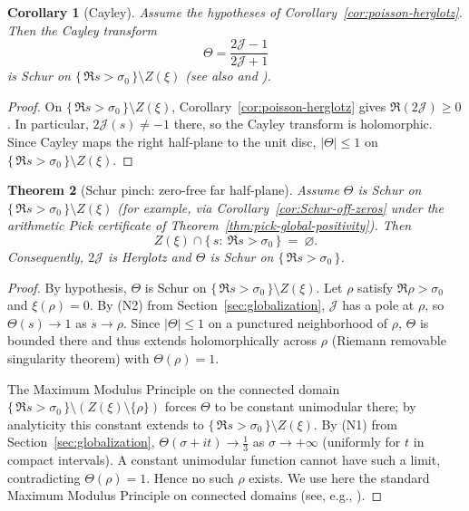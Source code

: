 \documentclass[11pt]{article}
\newtheorem{theorem}{Theorem}
\newtheorem{corollary}[theorem]{Corollary}
\theoremstyle{definition}
\theoremstyle{remark}
\theoremstyle{definition}
\begin{document}
\begin{corollary}[Cayley]\label{cor:cayley-schur}
Assume the hypotheses of Corollary~\ref{cor:poisson-herglotz}. Then the Cayley transform
\[
\Theta=\frac{2\mathcal J-1}{2\mathcal J+1}
\]
is Schur on $\{\,\Re s>\sigma_0\,\}\setminus Z(\xi)$ (see also \cite[Ch.~2]{RosenblumRovnyak} and \cite{SarasonSubHardy}).
\end{corollary}
\begin{proof}
On $\{\,\Re s>\sigma_0\,\}\setminus Z(\xi)$, Corollary~\ref{cor:poisson-herglotz} gives $\Re(2\mathcal J)\ge 0$. In particular, $2\mathcal J(s)\neq -1$ there, so the Cayley transform is holomorphic. Since Cayley maps the right half-plane to the unit disc, $|\Theta|\le 1$ on $\{\,\Re s>\sigma_0\,\}\setminus Z(\xi)$.
\end{proof}
\begin{theorem}[Schur pinch: zero-free far half-plane]\label{thm:globalize-main}
Assume \(\Theta\) is Schur on \(\{\,\Re s>\sigma_0\,\}\setminus Z(\xi)\) (for example, via Corollary~\ref{cor:Schur-off-zeros} under the arithmetic Pick certificate of Theorem~\ref{thm:pick-global-positivity}). Then
\[
  Z(\xi)\cap\{\,s:\ \Re s>\sigma_0\,\}\ =\ \varnothing.
\]
Consequently, $2\mathcal J$ is Herglotz and $\Theta$ is Schur on $\{\,\Re s>\sigma_0\,\}$.
\end{theorem}
\begin{proof}
By hypothesis, \(\Theta\) is Schur on \(\{\,\Re s>\sigma_0\,\}\setminus Z(\xi)\).
Let \(\rho\) satisfy \(\Re\rho>\sigma_0\) and \(\xi(\rho)=0\). By (N2) from Section~\ref{sec:globalization}, \(\mathcal J\) has a pole at \(\rho\), so \(\Theta(s)\to 1\) as \(s\to\rho\). Since \(|\Theta|\le 1\) on a punctured neighborhood of \(\rho\), \(\Theta\) is bounded there and thus extends holomorphically across \(\rho\) (Riemann removable singularity theorem) with \(\Theta(\rho)=1\).

The Maximum Modulus Principle on the connected domain \(\{\,\Re s>\sigma_0\,\}\setminus(Z(\xi)\setminus\{\rho\})\) forces \(\Theta\) to be constant unimodular there; by analyticity this constant extends to \(\{\,\Re s>\sigma_0\,\}\setminus Z(\xi)\).
By (N1) from Section~\ref{sec:globalization}, \(\Theta(\sigma+it)\to \tfrac13\) as \(\sigma\to+\infty\) (uniformly for \(t\) in compact intervals). A constant unimodular function cannot have such a limit, contradicting \(\Theta(\rho)=1\). Hence no such \(\rho\) exists.
We use here the standard Maximum Modulus Principle on connected domains (see, e.g., \cite{RudinRCA}).
\end{proof}
\end{document}
